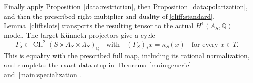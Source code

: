 Finally apply Proposition~\ref{data:restriction}, then
Proposition~\ref{data:polarization}, and then the prescribed
right multiplier and duality of \eqref{cliff:standard}.
Lemma~\ref{cliff:slots} transports the resulting tensor to the
actual $H^1(A_S,\mathbb Q)$ model. The target K\"unneth projectors
give a cycle
\[
 \Gamma_S\in\operatorname{CH}^2(S\times A_S\times A_S)_{\mathbb Q}
 \quad\text{with}\quad
 (\Gamma_S)_*x=\kappa_S(x)\quad\text{for every }x\in T.
\]
This is equality with the prescribed full map, including its
rational normalization, and completes the exact-data step in
Theorems~\ref{main:generic} and~\ref{main:specialization}.
